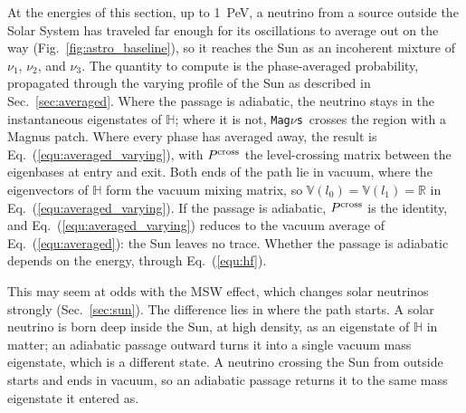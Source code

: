 \documentclass[final,5p,times,twocolumn,sort,compress]{elsarticle}
\makeatletter
\newcommand{\eq}{Eq.}
\newcommand{\fig}{Fig.}
\DeclareRobustCommand{\_}{%
  \ifmmode\nfss@text{\textunderscore}\else\textunderscore\allowbreak\fi}
\newcommand{\equ}[1]{\eq~(\ref{equ:#1})}
\newcommand{\figu}[1]{\fig~\ref{fig:#1}}
\newcommand{\magnus}{{\tt Mag}\ensuremath{\nu}{\tt s}}
\makeatother
\begin{document}
At the energies of this section, up to 1~PeV, a neutrino from a source outside the Solar System has traveled far enough for its oscillations to average out on the way (\figu{astro_baseline}), so it reaches the Sun as an incoherent mixture of $\nu_1$, $\nu_2$, and $\nu_3$. The quantity to compute is the phase-averaged probability, propagated through the varying profile of the Sun as described in Sec.~\ref{sec:averaged}. Where the passage is adiabatic, the neutrino stays in the instantaneous eigenstates of $\mathbb{H}$; where it is not, \magnus\ crosses the region with a Magnus patch. Where every phase has averaged away, the result is \equ{averaged_varying}, with $P^{\rm cross}$ the level-crossing matrix between the eigenbases at entry and exit. Both ends of the path lie in vacuum, where the eigenvectors of $\mathbb{H}$ form the vacuum mixing matrix, so $\mathbb{V}(l_0) = \mathbb{V}(l_1) = \mathbb{R}$ in \equ{averaged_varying}. If the passage is adiabatic, $P^{\rm cross}$ is the identity, and \equ{averaged_varying} reduces to the vacuum average of \equ{averaged}: the Sun leaves no trace. Whether the passage is adiabatic depends on the energy, through \equ{hf}.

This may seem at odds with the MSW effect, which changes solar neutrinos strongly (Sec.~\ref{sec:sun}). The difference lies in where the path starts. A solar neutrino is born deep inside the Sun, at high density, as an eigenstate of $\mathbb{H}$ in matter; an adiabatic passage outward turns it into a single vacuum mass eigenstate, which is a different state. A neutrino crossing the Sun from outside starts and ends in vacuum, so an adiabatic passage returns it to the same mass eigenstate it entered as.
\end{document}

